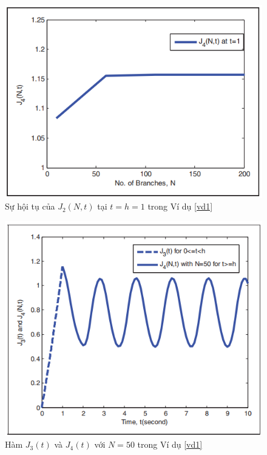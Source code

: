 \begin{vd}
\begin{figure}[h!]
	\includegraphics[scale= 0.7]{"./Hinh/Hinh14"}
	\caption[Sự hội tụ của $J_4(N,t)$ tại $t = h = 1$ trong Ví dụ \ref{vd1}]{Sự hội tụ của $J_2(N,t)$ tại $t = h = 1$ trong Ví dụ \ref{vd1}}
	\label{fig:hinh-14}
\end{figure}
\begin{figure}[h!]
	\centering
	\includegraphics[scale= 0.7]{"./Hinh/Hinh15"}
	\caption[Hàm $J_3(t)$ và $J_4(t)$ với $N = 50$ trong Ví dụ \ref{vd1} ]{Hàm $J_3(t)$ và $J_4(t)$ với $N = 50$ trong Ví dụ \ref{vd1}}
	\label{fig:hinh-15}
\end{figure}


\end{vd}
